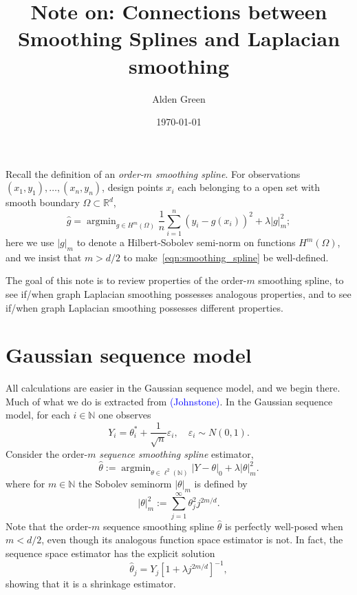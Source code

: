 \documentclass{article}
\newcommand{\Reals}{\mathbb{R}}
\newcommand{\1}{\mathbf{1}}
\DeclareMathOperator*{\argmin}{argmin}
\newcommand{\Rd}{\Reals^d}
\newcommand{\wh}[1]{\widehat{#1}}
\theoremstyle{alden}
\theoremstyle{aldenthm}
\theoremstyle{definition}
\theoremstyle{remark}
\begin{document}
\title{Note on: Connections between Smoothing Splines and Laplacian smoothing}
\author{Alden Green}
\date{\today}
\maketitle

Recall the definition of an \emph{order-$m$ smoothing spline}. For observations $(x_1,y_1),\ldots,(x_n,y_n)$, design points $x_i$ each belonging to a open set with smooth boundary $\Omega \subset \Rd$, 
\begin{equation}
\label{eqn:smoothing_spline}
\wh{g} = \argmin_{g \in H^m(\Omega)} \frac{1}{n} \sum_{i = 1}^{n} (y_i - g(x_i))^2 + \lambda |g|_{m}^2;
\end{equation}
here we use $|g|_{m}$ to denote a Hilbert-Sobolev semi-norm on functions $H^m(\Omega)$, and we insist that $m > d/2$ to make~\eqref{eqn:smoothing_spline} be well-defined. 

The goal of this note is to review properties of the order-$m$ smoothing spline, to see if/when graph Laplacian smoothing possesses analogous properties, and to see if/when graph Laplacian smoothing possesses different properties. 

\section{Gaussian sequence model}
All calculations are easier in the Gaussian sequence model, and we begin there. Much of what we do is extracted from \textcolor{blue}{(Johnstone)}. In the Gaussian sequence model, for each $i \in \mathbb{N}$ one observes
\begin{equation}
\label{model:gaussian_sequence_model}
Y_i = \theta_i^{\ast} + \frac{1}{\sqrt{n}}\varepsilon_i,\quad \varepsilon_i \sim N(0,1).
\end{equation}
Consider the order-$m$ \emph{sequence smoothing spline} estimator,
\begin{equation}
\label{eqn:sequence_smoothing_spline}
\wh{\theta} := \argmin_{\theta \in \ell^2(\mathbb{N})} |Y - \theta|_{0} + \lambda |\theta|_m^2.
\end{equation}
where for $m \in \mathbb{N}$ the Sobolev seminorm $|\theta|_m$ is defined by
\begin{equation*}
|\theta|_m^2 := \sum_{j = 1}^{\infty} \theta_j^2 j^{2m/d}.
\end{equation*}
Note that the order-$m$ sequence smoothing spline $\wh{\theta}$ is perfectly well-posed when $m < d/2$, even though its analogous function space estimator is not. In fact, the sequence space estimator has the explicit solution
\begin{equation}
\wh{\theta}_{j} = Y_j[1 + \lambda j^{2m/d}]^{-1},
\end{equation}
showing that it is a shrinkage estimator.
\end{document}
